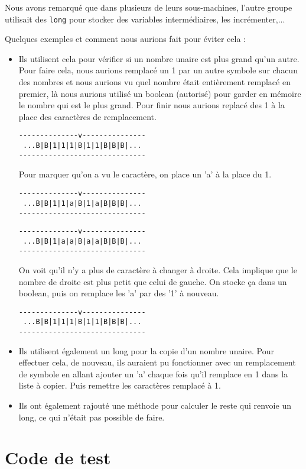 \documentclass[a4paper,11pt]{article}
\begin{document}
Nous avons remarqué que dans plusieurs de leurs sous-machines, l'autre groupe utilisait des \texttt{long} pour stocker des variables intermédiaires, les incrémenter,...

Quelques exemples et comment nous aurions fait pour éviter cela :
\begin{itemize}
\item Ils utilisent cela pour vérifier si un nombre unaire est plus grand qu'un autre. Pour faire cela, nous aurions remplacé un 1 par un autre symbole sur chacun des nombres et nous aurions vu quel nombre était entièrement remplacé en premier, là nous aurions utilisé un boolean (autorisé) pour garder en mémoire le nombre qui est le plus grand. Pour finir nous aurions replacé des 1 à la place des caractères de remplacement.
\begin{verbatim}
--------------v---------------
 ...B|B|1|1|1|B|1|1|B|B|B|...
------------------------------
\end{verbatim}
Pour marquer qu'on a vu le caractère, on place un 'a' à la place du 1.
\begin{verbatim}
--------------v---------------
 ...B|B|1|1|a|B|1|a|B|B|B|...
------------------------------
\end{verbatim}
\begin{verbatim}
--------------v---------------
 ...B|B|1|a|a|B|a|a|B|B|B|...
------------------------------
\end{verbatim}
On voit qu'il n'y a plus de caractère à changer à droite. Cela implique que le nombre de droite est plus petit que celui de gauche. On stocke ça dans un boolean, puis on remplace les 'a' par des '1' à nouveau.
\begin{verbatim}
--------------v---------------
 ...B|B|1|1|1|B|1|1|B|B|B|...
------------------------------
\end{verbatim}
\item Ils utilisent également un long pour la copie d'un nombre unaire. Pour effectuer cela, de nouveau, ils auraient pu fonctionner avec un remplacement de symbole en allant ajouter un 'a' chaque fois qu'il remplace en 1 dans la liste à copier. Puis remettre les caractères remplacé à 1.
\item Ils ont également rajouté une méthode pour calculer le reste qui renvoie un long, ce qui n'était pas possible de faire.
\end{itemize}

\newpage
\appendix

\section{Code de test}

\newpage
\end{document}
